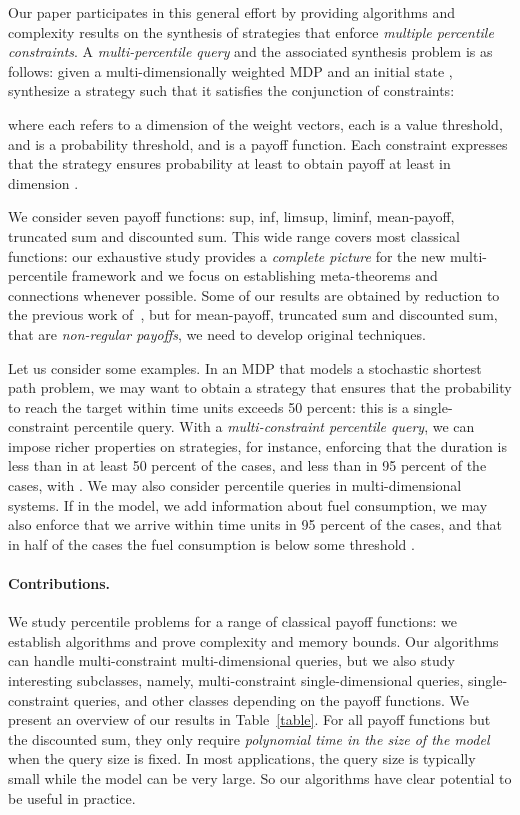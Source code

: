 \documentclass{llncs}
\begin{document}
Our paper participates in this general effort by providing algorithms and complexity results on the synthesis of strategies that enforce {\em multiple percentile constraints}.  A \textit{multi-percentile query} and the associated synthesis problem is as follows: given a multi-dimensionally weighted MDP  and an initial state , synthesize a strategy  such that it satisfies the conjunction of  constraints:

where each  refers to a dimension of the weight vectors, each  is a value threshold, and  is a probability threshold, and  is a payoff function. Each constraint  expresses that the strategy ensures probability at least  to obtain payoff at least  in dimension .

We consider seven payoff functions: sup, inf, limsup, liminf, mean-payoff, truncated sum and discounted sum. This wide range covers most classical functions: our exhaustive study provides a \textit{complete picture} for the new multi-percentile framework and we focus on establishing meta-theorems and connections whenever possible. Some of our results are obtained by reduction to the previous work of~\cite{EKVY-lmcs08}, but for mean-payoff, truncated sum and discounted sum, that are {\em non-regular payoffs}, we need to develop original techniques.

Let us consider some examples. In an MDP that models a stochastic shortest path problem, we may want to obtain a strategy that ensures that the probability to reach the target within  time units exceeds 50 percent: this is a single-constraint percentile query. With a {\em multi-constraint percentile query}, we can impose richer properties on strategies,
for instance, enforcing that the duration is less than  in at least 50 percent of the cases, and less than  in 95 percent of the cases, with . 
We may also consider percentile queries in multi-dimensional systems. If in the model, we add information about fuel consumption, we may also enforce that we arrive within  time units in 95 percent of the cases, and that in half of the cases the fuel consumption is below some threshold .

\paragraph{\bf Contributions.} We study percentile problems for a range of classical payoff functions: we establish algorithms and prove complexity and memory bounds.
Our algorithms can handle multi-constraint multi-dimensional queries, but
we also study interesting subclasses, namely, multi-constraint single-dimensional queries, single-constraint queries, and other classes depending on the payoff functions.
We present an overview of our results in Table~\ref{table}.
For all payoff functions but the discounted sum, they only require \textit{polynomial time in the size of the model} when the query size is fixed. 
In most applications, the query size is typically small while the model
can be very large. So our algorithms have clear potential to be useful in practice.
\end{document}
